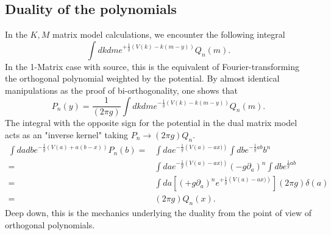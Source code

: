 \documentclass[english]{article}
\begin{document}
\subsection{Duality of the polynomials}

In the $K,M$ matrix model calculations, we encounter the following integral
\begin{equation} 
  \int dk dm e^{+\frac{1}{g}\left( V(k)-k(m-y) \right)} Q_{n}(m).
\end{equation}
In the 1-Matrix case with source, this is the equivalent of Fourier-transforming the orthogonal polynomial weighted by the potential. 
By almost identical manipulations as the proof of bi-orthogonality, one shows that 
 \begin{equation} 
P_{n}(y) = \frac{1}{(2\pi g ) }\int dk dm e^{-\frac{1}{g}\left( V(k)-k(m-y) \right)} Q_{n}(m).
\end{equation}
The integral with the opposite sign for the potential in the dual matrix model acts as an "inverse kernel" taking $P_{n} \rightarrow (2\pi g)Q_{n}$.
\begin{align}
     \int da db e^{-\frac{1}{g}\left(V(a) +a(b-x)\right)} P_{n}(b) = & \int da  e^{-\frac{1}{g}\left(V(a) -a x)\right)}\int db e^{-\frac{1}{g}ab}b^n \\
     = & \int da  e^{-\frac{1}{g}\left(V(a) -a x)\right)} (-g \partial_{a})^{n}\int db e^{\frac{1}{g}a b} \\
     = & \int da \left[(+g \partial_{a})^{n}e^{+\frac{1}{g}\left(V(a) -a x)\right)} \right] (2 \pi g) \delta(a)\\
     =& ( 2\pi g) Q_{n}(x).
\end{align}
Deep down, this is the mechanics underlying the duality from the point of view of orthogonal polynomials. 
\end{document}
